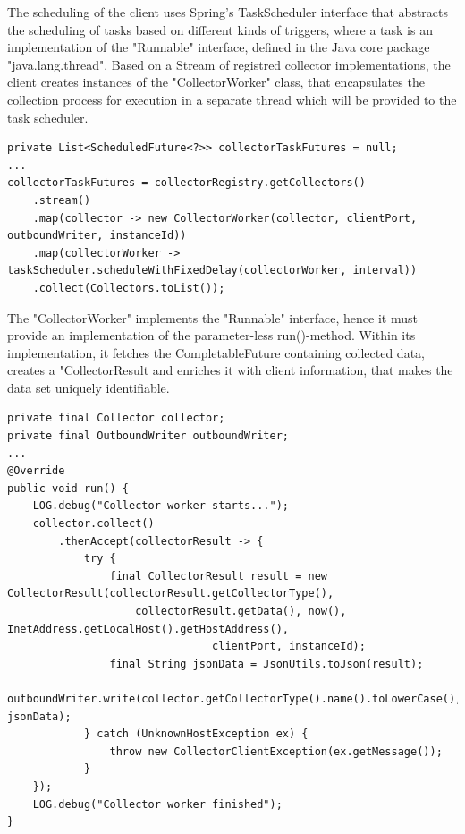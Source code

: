The scheduling of the client uses Spring's TaskScheduler interface that abstracts the scheduling of tasks based on different
kinds of triggers, where a task is an implementation of the "Runnable" interface, defined in the Java core package "java.lang.thread".
Based on a Stream of registred collector implementations, the client creates instances of the "CollectorWorker" class, that
encapsulates the collection process for execution in a separate thread which will be provided to the task scheduler.

\begin{lstlisting}[caption={"CollectorClient", collector registry}, captionpos=b, label={lst:collector-client-registry}]
private List<ScheduledFuture<?>> collectorTaskFutures = null;
...
collectorTaskFutures = collectorRegistry.getCollectors()
    .stream()
    .map(collector -> new CollectorWorker(collector, clientPort, outboundWriter, instanceId))
    .map(collectorWorker -> taskScheduler.scheduleWithFixedDelay(collectorWorker, interval))
    .collect(Collectors.toList());
\end{lstlisting}

The "CollectorWorker" implements the "Runnable" interface, hence it must provide an implementation of the parameter-less
run()-method. Within its implementation, it fetches the CompletableFuture containing collected data, creates a "CollectorResult and
enriches it with client information, that makes the data set uniquely identifiable.

\begin{lstlisting}[caption={"CollectorWorker", collector registry}, captionpos=b, label={lst:collector-worker}]
private final Collector collector;
private final OutboundWriter outboundWriter;
...
@Override
public void run() {
    LOG.debug("Collector worker starts...");
    collector.collect()
        .thenAccept(collectorResult -> {
            try {
                final CollectorResult result = new CollectorResult(collectorResult.getCollectorType(),
                    collectorResult.getData(), now(), InetAddress.getLocalHost().getHostAddress(),
                                clientPort, instanceId);
                final String jsonData = JsonUtils.toJson(result);
                outboundWriter.write(collector.getCollectorType().name().toLowerCase(), jsonData);
            } catch (UnknownHostException ex) {
                throw new CollectorClientException(ex.getMessage());
            }
    });
    LOG.debug("Collector worker finished");
}
\end{lstlisting}

